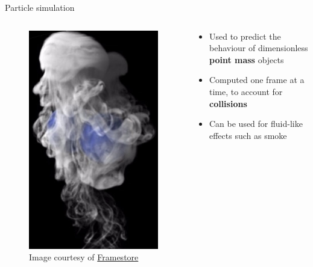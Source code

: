 \begin{frame}{Particle simulation}
	\begin{columns}
		\begin{column}{0.3\textwidth}
			\begin{figure}
				\includegraphics[width=\textwidth]{particles}
				\caption*{Image courtesy of \href{https://www.framestore.com}{Framestore}}
			\end{figure}
		\end{column}
		\begin{column}{0.65\textwidth}
			\begin{itemize}
				\pause\item Used to predict the behaviour of dimensionless \textbf{point mass} objects
				\pause\item Computed one frame at a time, to account for \textbf{collisions}
				\pause\item Can be used for fluid-like effects such as smoke
			\end{itemize}
		\end{column}
	\end{columns}
\end{frame}

